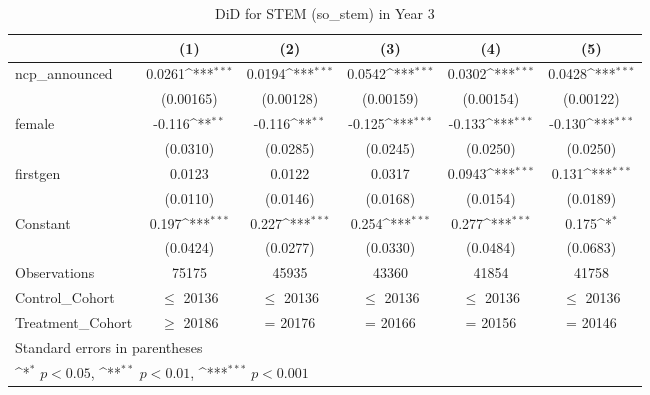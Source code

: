 \begin{table}[htbp]\centering
\def\sym#1{\ifmmode^{#1}\else\(^{#1}\)\fi}
\caption{DiD for STEM (so\_stem) in Year 3}
\begin{tabular}{l*{5}{c}}
\toprule
                &\multicolumn{1}{c}{(1)}         &\multicolumn{1}{c}{(2)}         &\multicolumn{1}{c}{(3)}         &\multicolumn{1}{c}{(4)}         &\multicolumn{1}{c}{(5)}         \\
\midrule
ncp\_announced   &   0.0261\sym{***}&   0.0194\sym{***}&   0.0542\sym{***}&   0.0302\sym{***}&   0.0428\sym{***}\\
                &(0.00165)         &(0.00128)         &(0.00159)         &(0.00154)         &(0.00122)         \\
\addlinespace
female          &   -0.116\sym{**} &   -0.116\sym{**} &   -0.125\sym{***}&   -0.133\sym{***}&   -0.130\sym{***}\\
                & (0.0310)         & (0.0285)         & (0.0245)         & (0.0250)         & (0.0250)         \\
\addlinespace
firstgen        &   0.0123         &   0.0122         &   0.0317         &   0.0943\sym{***}&    0.131\sym{***}\\
                & (0.0110)         & (0.0146)         & (0.0168)         & (0.0154)         & (0.0189)         \\
\addlinespace
Constant        &    0.197\sym{***}&    0.227\sym{***}&    0.254\sym{***}&    0.277\sym{***}&    0.175\sym{*}  \\
                & (0.0424)         & (0.0277)         & (0.0330)         & (0.0484)         & (0.0683)         \\
\midrule
Observations    &    75175         &    45935         &    43360         &    41854         &    41758         \\
Control\_Cohort  &$\le$ 20136         &$\le$ 20136         &$\le$ 20136         &$\le$ 20136         &$\le$ 20136         \\
Treatment\_Cohort&$\ge$ 20186         &  = 20176         &  = 20166         &  = 20156         &  = 20146         \\
\bottomrule
\multicolumn{6}{l}{\footnotesize Standard errors in parentheses}\\
\multicolumn{6}{l}{\footnotesize \sym{*} \(p<0.05\), \sym{**} \(p<0.01\), \sym{***} \(p<0.001\)}\\
\end{tabular}
\end{table}
